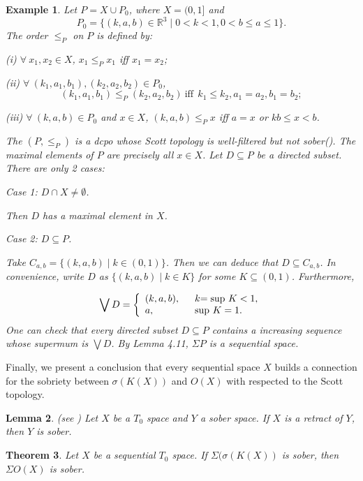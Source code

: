\documentclass[preprint,12pt]{elsarticle}
\numberwithin{equation}{section}
\newtheorem{theorem}{Theorem}[section]
\newtheorem{lemma}[theorem]{Lemma}
\newtheorem{example}[theorem]{Example}
\begin{document}
\begin{example} {\rm Let $P=X\cup P_{0}$, where $X=(0,1]$ and $$P_{0}=\{(k,a,b)\in\mathbb{R}^{3}\mid 0<k<1,0<b\leq a\leq 1\}.$$
The order $\leq_{P}$ on $P$ is defined by:

(i) $\forall\ x_{1},x_{2}\in X$, $x_{1}\leq_{P}x_{1}$ iff $x_{1}=x_{2}$;

(ii) $\forall\ (k_{1},a_{1},b_{1}),(k_{2},a_{2},b_{2})\in P_{0}$,
 $$(k_{1},a_{1},b_{1})\leq_{P}(k_{2},a_{2},b_{2})\ \mbox{iff}\ \ k_{1}\leq k_{2}, a_{1}=a_{2},b_{1}=b_{2};$$

(iii) $\forall\ (k,a,b)\in P_{0}$ and $x\in X$, $(k,a,b)\leq_{P} x$ iff $a=x$ or $kb\leq x< b$.

The $(P,\leq_{P})$ is a dcpo whose Scott topology is well-filtered but not sober(\cite{ME182}). The maximal elements of $P$ are precisely all $x\in X$. Let $D\subseteq P$ be a directed subset. There are only 2 cases:

Case 1: $D\cap X\neq\emptyset$.

Then $D$ has a maximal element in $X$.

Case 2: $D\subseteq P$.

Take $C_{a,b}=\{(k,a,b)\mid k\in(0,1)\}$. Then we can deduce that $D\subseteq C_{a,b}$. In convenience, write $D$ as $\{(k,a,b)\mid k\in K\}$ for some $K\subseteq(0,1)$. Furthermore,

$$\bigvee D=\left\{
             \begin{array}{ll}
              (k,a,b), &\ \ k{\rm=sup}\ K<1, \\
              a, &\ \ {\rm sup}\ K=1.
             \end{array}
           \right.$$
One can check that every directed subset $D\subseteq P$ contains a increasing sequence whose supermum is $\bigvee D$. By Lemma 4.11, $\Sigma P$ is a sequential space.
}
\end{example}


Finally, we present a conclusion that every sequential space $X$ builds a connection for the sobriety between $\sigma(K(X))$ and $O(X)$ with respected to the Scott topology.

\begin{lemma}{\rm (see \cite{GG03}) Let $X$ be a  $T_{0}$ space and $Y$ a sober space. If $X$ is a retract of $Y$, then $Y$ is sober.}
\end{lemma}


\begin{theorem} {\rm Let $X$ be a sequential $T_{0}$ space. If $\Sigma (\sigma(K(X))$ is sober, then $\Sigma O(X)$ is sober.}
\end{theorem}
\end{document}
